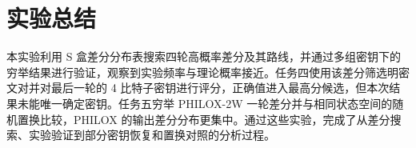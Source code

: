 \section{实验总结}

本实验利用 S 盒差分分布表搜索四轮高概率差分及其路线，并通过多组密钥下的穷举结果进行验证，观察到实验频率与理论概率接近。任务四使用该差分筛选明密文对并对最后一轮的 4 比特子密钥进行评分，正确值进入最高分候选，但本次结果未能唯一确定密钥。任务五穷举 PHILOX-2W 一轮差分并与相同状态空间的随机置换比较，PHILOX 的输出差分分布更集中。通过这些实验，完成了从差分搜索、实验验证到部分密钥恢复和置换对照的分析过程。
